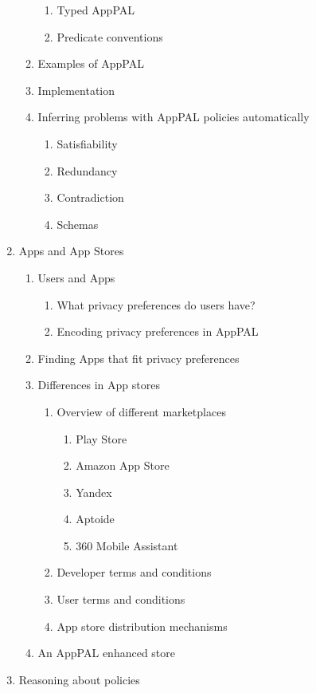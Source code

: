 \documentclass[a4paper]{scrartcl}
\begin{document}
\begin{enumerate}
\begin{enumerate}[3.1]
\begin{enumerate}[{3.2.}1]
    \item Typed AppPAL
    \item Predicate conventions
    \end{enumerate}
  \item Examples of AppPAL
  \item Implementation
  \item Inferring problems with AppPAL policies automatically
    \begin{enumerate}[{3.4.}1]
    \item Satisfiability
    \item Redundancy
    \item Contradiction
    \item Schemas
    \end{enumerate}
  \end{enumerate}
\item Apps and App Stores
  \begin{enumerate}[4.1]
  \item Users and Apps
    \begin{enumerate}[{4.1.}1]
    \item What privacy preferences do users have?
    \item Encoding privacy preferences in AppPAL
    \end{enumerate}
  \item Finding Apps that fit privacy preferences
  \item Differences in App stores
    \begin{enumerate}[{4.3.}1]
    \item Overview of different marketplaces
      \begin{enumerate}[{4.3.1.}1]
      \item Play Store
      \item Amazon App Store
      \item Yandex
      \item Aptoide
      \item 360 Mobile Assistant
      \end{enumerate}
    \item Developer terms and conditions
    \item User terms and conditions
    \item App store distribution mechanisms
    \end{enumerate}
  \item An AppPAL enhanced store
  \end{enumerate}
\item Reasoning about policies

\end{enumerate}
\end{document}
